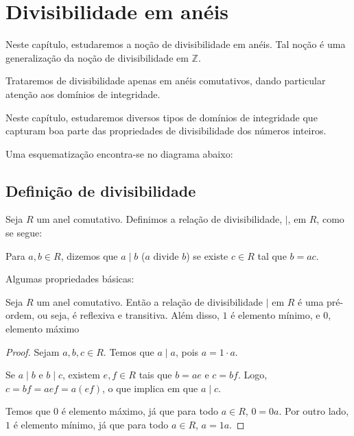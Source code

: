 \chapter{Divisibilidade em anéis}
Neste capítulo, estudaremos a noção de divisibilidade em anéis.
Tal noção é uma generalização da noção de divisibilidade em $\mathbb Z$.

Trataremos de divisibilidade apenas em anéis comutativos, dando particular atenção aos domínios de integridade.

Neste capítulo, estudaremos diversos tipos de domínios de integridade que capturam boa parte das propriedades de divisibilidade dos números inteiros.

Uma esquematização encontra-se no diagrama abaixo:

\begin{center}
\end{center}

\section{Definição de divisibilidade}

\begin{definition}
Seja $R$ um anel comutativo. Definimos a relação de divisibilidade, $\mid $, em $R$, como se segue:

Para $a, b \in R$, dizemos que $a\mid b$ ($a$ divide $b$) se existe $c \in R$ tal que $b=ac$.
\end{definition}
Algumas propriedades básicas:
\begin{prop}
    Seja $R$ um anel comutativo.
    Então a relação de divisibilidade $\mid $ em $R$ é uma pré-ordem, ou seja, é reflexiva e transitiva. Além disso, $1$ é elemento mínimo, e $0$, elemento máximo
\end{prop}

\begin{proof}Sejam $a, b, c \in R$.
    Temos que $a\mid a$, pois $a=1\cdot a$.

    Se $a\mid b$ e $b\mid c$, existem $e, f \in R$ tais que $b=ae$ e $c=bf$.
    Logo, $c=bf=aef=a(ef)$, o que implica em que $a\mid c$.

    Temos que $0$ é elemento máximo, já que para todo $a \in R$, $0=0a$.
    Por outro lado, $1$ é elemento mínimo, já que para todo $a \in R$, $a=1a$.
\end{proof}

